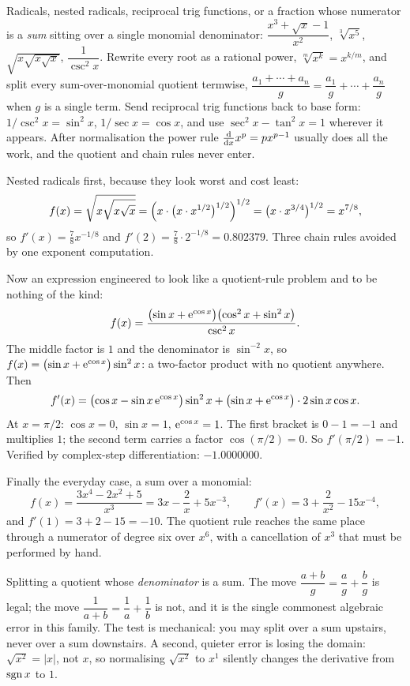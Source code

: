 \cue Radicals, nested radicals, reciprocal trig functions, or a fraction whose numerator is a \emph{sum} sitting over a single monomial denominator: $\dfrac{x^{3}+\sqrt{x}-1}{x^{2}}$, $\sqrt[3]{x^{5}}$, $\sqrt{x\sqrt{x\sqrt{x}}}$, $\dfrac{1}{\csc^{2}x}$.
\method Rewrite every root as a rational power, $\sqrt[m]{x^{k}}=x^{k/m}$, and split every sum-over-monomial quotient termwise, $\dfrac{a_{1}+\cdots+a_{n}}{g}=\dfrac{a_{1}}{g}+\cdots+\dfrac{a_{n}}{g}$ when $g$ is a single term. Send reciprocal trig functions back to base form: $1/\csc^{2}x=\sin^{2}x$, $1/\sec x=\cos x$, and use $\sec^{2}x-\tan^{2}x=1$ wherever it appears. After normalisation the power rule $\frac{\mathrm{d}}{\mathrm{d}x}x^{p}=px^{p-1}$ usually does all the work, and the quotient and chain rules never enter.

\begin{worked}
Nested radicals first, because they look worst and cost least:
\[
f(x)=\sqrt{x\sqrt{x\sqrt{x}}}=\Bigl(x\cdot\bigl(x\cdot x^{1/2}\bigr)^{1/2}\Bigr)^{1/2}=\bigl(x\cdot x^{3/4}\bigr)^{1/2}=x^{7/8},
\]
so $f'(x)=\tfrac78x^{-1/8}$ and $f'(2)=\tfrac78\cdot2^{-1/8}=0.802379$. Three chain rules avoided by one exponent computation.

Now an expression engineered to look like a quotient-rule problem and to be nothing of the kind:
\[
f(x)=\frac{\bigl(\sin x+\mathrm{e}^{\cos x}\bigr)\bigl(\cos^{2}x+\sin^{2}x\bigr)}{\csc^{2}x}.
\]
The middle factor is $1$ and the denominator is $\sin^{-2}x$, so $f(x)=\bigl(\sin x+\mathrm{e}^{\cos x}\bigr)\sin^{2}x$: a two-factor product with no quotient anywhere. Then
\[
f'(x)=\bigl(\cos x-\sin x\,\mathrm{e}^{\cos x}\bigr)\sin^{2}x+\bigl(\sin x+\mathrm{e}^{\cos x}\bigr)\cdot 2\sin x\cos x .
\]
At $x=\pi/2$: $\cos x=0$, $\sin x=1$, $\mathrm{e}^{\cos x}=1$. The first bracket is $0-1=-1$ and multiplies $1$; the second term carries a factor $\cos(\pi/2)=0$. So $f'(\pi/2)=-1$. Verified by complex-step differentiation: $-1.0000000$.

Finally the everyday case, a sum over a monomial:
\[
f(x)=\frac{3x^{4}-2x^{2}+5}{x^{3}}=3x-\frac{2}{x}+5x^{-3},\qquad f'(x)=3+\frac{2}{x^{2}}-15x^{-4},
\]
and $f'(1)=3+2-15=-10$. The quotient rule reaches the same place through a numerator of degree six over $x^{6}$, with a cancellation of $x^{3}$ that must be performed by hand.
\end{worked}

\begin{trap}
Splitting a quotient whose \emph{denominator} is a sum. The move $\dfrac{a+b}{g}=\dfrac ag+\dfrac bg$ is legal; the move $\dfrac{1}{a+b}=\dfrac1a+\dfrac1b$ is not, and it is the single commonest algebraic error in this family. The test is mechanical: you may split over a sum upstairs, never over a sum downstairs. A second, quieter error is losing the domain: $\sqrt{x^{2}}=\lvert x\rvert$, not $x$, so normalising $\sqrt{x^{2}}$ to $x^{1}$ silently changes the derivative from $\operatorname{sgn} x$ to $1$.
\end{trap}

